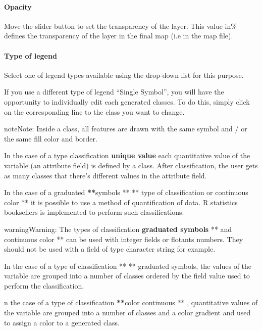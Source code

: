 \documentclass[letterpaper,10pt,english]{sphinxmanual}
\begin{document}
\paragraph{Opacity}

Move the slider button to set the transparency of the layer. This value in\% defines the transparency of the layer in the final map (i.e in the map file).
\paragraph{Type of legend}

Select one of legend types available using the drop-down list for this purpose.

If you use a different type of legend ``Single Symbol'', you will have the opportunity to individually edit each generated classes. To do this, simply click on the corresponding line to the class you want to change.

\begin{notice}{note}{Note:}
Inside a class, all features are drawn with the same symbol and / or the same fill color and border.
\end{notice}

In the case of a type classification \textbf{unique value} each quantitative value of the variable (an attribute field) is defined by a class. After classification, the user gets as many classes that there's different values ​​in the attribute field.

In the case of a graduated  {\color{red}\bfseries{}**}symbols ** ** type of classification or continuous color ** it is possible to use a method of quantification of data. R statistics booksellers is implemented to perform such classifications.

\begin{notice}{warning}{Warning:}
The types of classification  \textbf{graduated symbols} **  and continuous color ** can be used with integer fields or flotants numbers. They should not be used with a field of type character string for example.
\end{notice}

In the case of a type of classification ** ** graduated symbols, the values of the variable are grouped into a number of classes ordered by the field value used to perform the classification.

n the case of a type of classification {\color{red}\bfseries{}**}color continuous ** , quantitative values of the variable are grouped into a number of classes and a color gradient and used to assign a color to a generated class.
\end{document}
